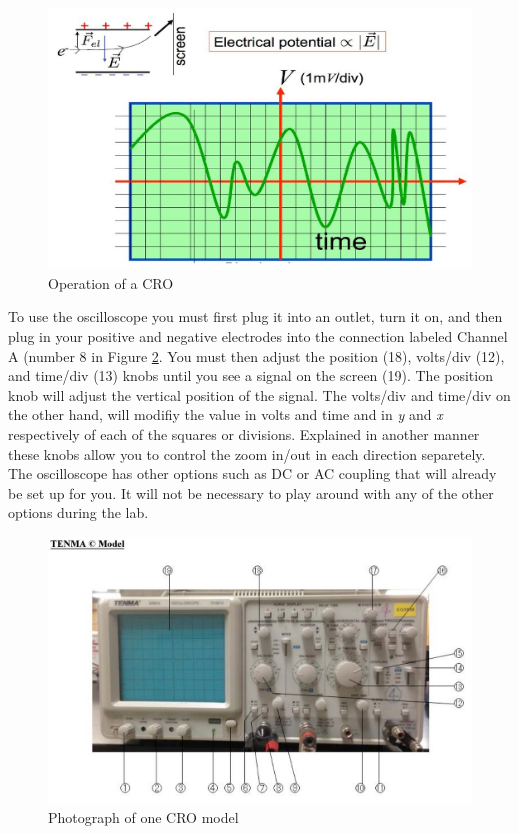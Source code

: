 \documentclass[12pt]{report}
\begin{document}
\begin{appendix}
\begin{figure}[h]
\centering
\includegraphics[scale=1.2]{appendix-cro-data}
\caption{Operation of a CRO}
\label{Fig:Appendix-CRO-data}
\end{figure}

To use the oscilloscope you must first plug it into an outlet, turn it on, and then plug in your positive and negative electrodes into the connection labeled Channel A (number 8 in Figure \ref{Fig:Appendix-CRO}. You must then adjust the position (18), volts/div (12), and time/div (13) knobs until you see a signal on the screen (19). The position knob will adjust the vertical position of the signal. The volts/div and time/div on the other hand, will modifiy the value in volts and time and in \textit{y} and \textit{x} respectively of each of the squares or divisions. Explained in another manner these knobs allow you to control the zoom in/out in each direction separetely. The oscilloscope has other options such as DC or AC coupling that will already be set up for you. It will not be necessary to play around with any of the other options during the lab. 

\begin{figure}[h]
\centering
\includegraphics[scale=1]{appendix-cro-pic}
\caption{Photograph of one CRO model}
\label{Fig:Appendix-CRO}
\end{figure}


\end{appendix}
\end{document}
